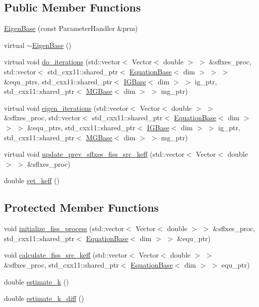 \subsection*{Public Member Functions}
\begin{DoxyCompactItemize}
\item 
\hyperlink{class_eigen_base_a041823ed11437980ff73ada87a9717fe}{Eigen\+Base} (const Parameter\+Handler \&prm)
\item 
virtual \hyperlink{class_eigen_base_afe9efbe26f3d5a427caa1d5022555038}{$\sim$\+Eigen\+Base} ()
\item 
virtual void \hyperlink{class_eigen_base_a8a9ef8878e5b7199aa662f2b61b2d864}{do\+\_\+iterations} (std\+::vector$<$ Vector$<$ double $>$ $>$ \&sflxes\+\_\+proc, std\+::vector$<$ std\+\_\+cxx11\+::shared\+\_\+ptr$<$ \hyperlink{class_equation_base}{Equation\+Base}$<$ dim $>$ $>$ $>$ \&equ\+\_\+ptrs, std\+\_\+cxx11\+::shared\+\_\+ptr$<$ \hyperlink{class_i_g_base}{I\+G\+Base}$<$ dim $>$ $>$ ig\+\_\+ptr, std\+\_\+cxx11\+::shared\+\_\+ptr$<$ \hyperlink{class_m_g_base}{M\+G\+Base}$<$ dim $>$ $>$ mg\+\_\+ptr)
\item 
virtual void \hyperlink{class_eigen_base_ae09830ed4bcb14b7b699cd5f5460fab7}{eigen\+\_\+iterations} (std\+::vector$<$ Vector$<$ double $>$ $>$ \&sflxes\+\_\+proc, std\+::vector$<$ std\+\_\+cxx11\+::shared\+\_\+ptr$<$ \hyperlink{class_equation_base}{Equation\+Base}$<$ dim $>$ $>$ $>$ \&equ\+\_\+ptrs, std\+\_\+cxx11\+::shared\+\_\+ptr$<$ \hyperlink{class_i_g_base}{I\+G\+Base}$<$ dim $>$ $>$ ig\+\_\+ptr, std\+\_\+cxx11\+::shared\+\_\+ptr$<$ \hyperlink{class_m_g_base}{M\+G\+Base}$<$ dim $>$ $>$ mg\+\_\+ptr)
\item 
virtual void \hyperlink{class_eigen_base_aa51c202e12e88c70652aefbe4d399f2b}{update\+\_\+prev\+\_\+sflxes\+\_\+fiss\+\_\+src\+\_\+keff} (std\+::vector$<$ Vector$<$ double $>$ $>$ \&sflxes\+\_\+proc)
\item 
double \hyperlink{class_eigen_base_a00569bdce088f65f71f4c743c6ec6c9b}{get\+\_\+keff} ()
\end{DoxyCompactItemize}
\subsection*{Protected Member Functions}
\begin{DoxyCompactItemize}
\item 
void \hyperlink{class_eigen_base_a982ceb033a4452633c612491544ab100}{initialize\+\_\+fiss\+\_\+process} (std\+::vector$<$ Vector$<$ double $>$ $>$ \&sflxes\+\_\+proc, std\+\_\+cxx11\+::shared\+\_\+ptr$<$ \hyperlink{class_equation_base}{Equation\+Base}$<$ dim $>$ $>$ \&equ\+\_\+ptr)
\item 
void \hyperlink{class_eigen_base_a325ceda011337e2416cef726bbd5d28f}{calculate\+\_\+fiss\+\_\+src\+\_\+keff} (std\+::vector$<$ Vector$<$ double $>$ $>$ \&sflxes\+\_\+proc, std\+\_\+cxx11\+::shared\+\_\+ptr$<$ \hyperlink{class_equation_base}{Equation\+Base}$<$ dim $>$ $>$ equ\+\_\+ptr)
\item 
double \hyperlink{class_eigen_base_a1ad5ce67d3534960731d34691db2f4d9}{estimate\+\_\+k} ()
\item 
double \hyperlink{class_eigen_base_ac9b7836c98e95a8be4d57b3ccf11f185}{estimate\+\_\+k\+\_\+diff} ()
\end{DoxyCompactItemize}
